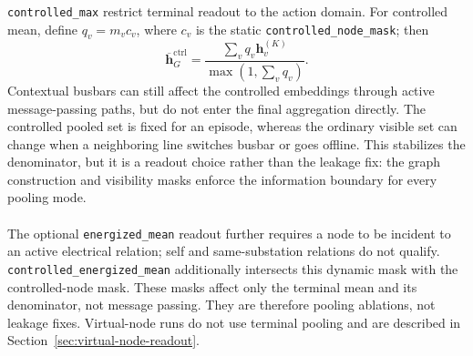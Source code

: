 \texttt{controlled\_max} restrict terminal readout to the action domain. For
controlled mean, define $q_v=m_vc_v$, where $c_v$ is the static
\texttt{controlled\_node\_mask}; then
\begin{equation}
  \overline{\mathbf{h}}^{\mathrm{ctrl}}_G =
  \frac{\sum_v q_v\mathbf{h}^{(K)}_v}
       {\max(1,\sum_v q_v)}.
  \label{eq:methods-controlled-mean-pooling}
\end{equation}
Contextual busbars can still affect the controlled embeddings through active
message-passing paths, but do not enter the final aggregation directly. The
controlled pooled set is fixed for an episode, whereas the ordinary visible
set can change when a neighboring line switches busbar or goes offline. This
stabilizes the denominator, but it is a readout choice rather than the leakage
fix: the graph construction and visibility masks enforce the information
boundary for every pooling mode.
\\
\\
The optional \texttt{energized\_mean} readout further requires a node to be
incident to an active electrical relation; self and same-substation relations
do not qualify. \texttt{controlled\_energized\_mean} additionally intersects
this dynamic mask with the controlled-node mask. These masks affect only the
terminal mean and its denominator, not message passing. They are therefore
pooling ablations, not leakage fixes. Virtual-node runs do not use terminal
pooling and are described in Section~\ref{sec:virtual-node-readout}.

